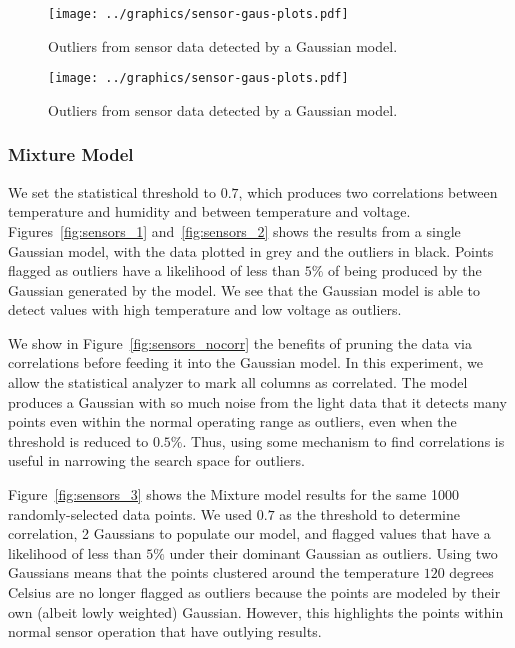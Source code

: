 \begin{figure}[h]
\centering
\texttt{[image: ../graphics/sensor-gaus-plots.pdf]}
\caption{Outliers from sensor data detected by a Gaussian model.}
\label{fig:sensors_gaus_1-5}
\end{figure}
\begin{figure}[h]
\centering
\texttt{[image: ../graphics/sensor-gaus-plots.pdf]}
\caption{Outliers from sensor data detected by a Gaussian model.}
\label{fig:sensors_gaus_1-5b}
\end{figure}

\subsubsection{Mixture Model}
We set the statistical threshold to $0.7$, which produces two correlations between temperature and humidity and between temperature and voltage.
Figures~\ref{fig:sensors_1} and~\ref{fig:sensors_2} shows the results from a single Gaussian model, with the data plotted in grey and the outliers in black.
Points flagged as outliers have a likelihood of less than $5\%$ of being produced by the Gaussian generated by the model.
We see that the Gaussian model is able to detect values with high temperature and low voltage as outliers.
 
We show in Figure~\ref{fig:sensors_nocorr} the benefits of pruning the data via correlations before feeding it into the Gaussian model.
In this experiment, we allow the statistical analyzer to mark all columns as correlated.
The model produces a Gaussian with so much noise from the light data that it detects many points even within the normal operating range as outliers, even when the threshold is reduced to $0.5\%$. 
Thus, using some mechanism to find correlations is useful in narrowing the search space for outliers.
 
Figure~\ref{fig:sensors_3} shows the Mixture model results for the same 1000 randomly-selected data points. 
We used $0.7$ as the threshold to determine correlation, 2 Gaussians to populate our model, and flagged values that have a likelihood of less than $5\%$ under their dominant Gaussian as outliers.
Using two Gaussians means that the points clustered around the temperature $120$ degrees Celsius are no longer flagged as outliers because the points are modeled by their own (albeit lowly weighted) Gaussian.
However, this highlights the points within normal sensor operation that have outlying results.
 


